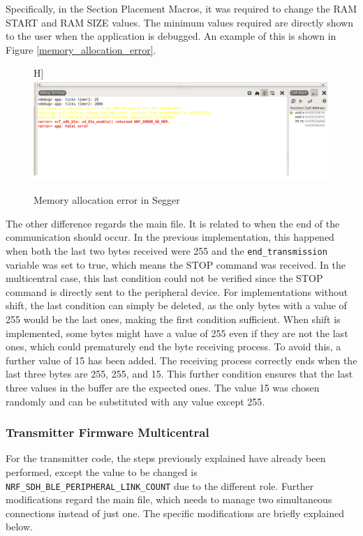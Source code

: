 \documentclass{Configuration_Files/PoliMi3i_thesis}
\begin{document}
Specifically, in the Section Placement Macros, it was required to change the RAM START and RAM SIZE values. The minimum values required are directly shown to the user when the application is debugged. An example of this is shown in Figure \ref{memory_allocation_error}.

\begin{figure}H]
    \centering
    \includegraphics[scale=0.6]{Multicentral/4.png}
    \caption{Memory allocation error in Segger}
    \label{multicentral_4}
\end{figure}

The other difference regards the main file. It is related to when the end of the communication should occur. In the previous implementation, this happened when both the last two bytes received were 255 and the \texttt{end\_transmission} variable was set to true, which means the STOP command was received. In the multicentral case, this last condition could not be verified since the STOP command is directly sent to the peripheral device. For implementations without shift, the last condition can simply be deleted, as the only bytes with a value of 255 would be the last ones, making the first condition sufficient. When shift is implemented, some bytes might have a value of 255 even if they are not the last ones, which could prematurely end the byte receiving process. To avoid this, a further value of 15 has been added. The receiving process correctly ends when the last three bytes are 255, 255, and 15. This further condition ensures that the last three values in the buffer are the expected ones. The value 15 was chosen randomly and can be substituted with any value except 255.

\subsubsection{Transmitter Firmware Multicentral}
For the transmitter code, the steps previously explained have already been performed, except the value to be changed is \texttt{NRF\_SDH\_BLE\_PERIPHERAL\_LINK\_COUNT} due to the different role. Further modifications regard the main file, which needs to manage two simultaneous connections instead of just one. The specific modifications are briefly explained below.
\end{document}

